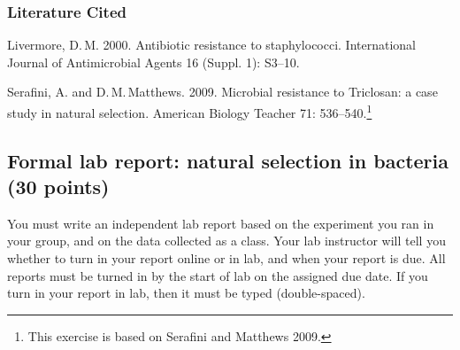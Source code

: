 \documentclass[12pt]{exam}
\newlength{\litindent}
\begin{document}
\begin{questions}
%
%
%
%	
%		
%
%
%
\end{questions}

\subsubsection*{Literature Cited}

Livermore, D.\,M. 2000. Antibiotic resistance to staphylococci. International Journal of Antimicrobial Agents 16 (Suppl. 1): S3–10.

Serafini, A. and D.\,M.\,Matthews. 2009. Microbial resistance to Triclosan: a case study in natural selection. American Biology Teacher 71: 536–540.\footnote{This exercise is based on Serafini and Matthews 2009.}


\subsection*{Formal lab report: natural selection in bacteria (30 points)}

You must write an independent lab report based on
the experiment you ran in your group, and on the data collected as a
class. Your lab instructor will tell you whether to turn in your report online or in lab, and when your report is due. All reports must be turned in by the start of lab on the assigned due date. If you turn in your report in lab, then it must be typed (double-spaced).  
\end{document}
